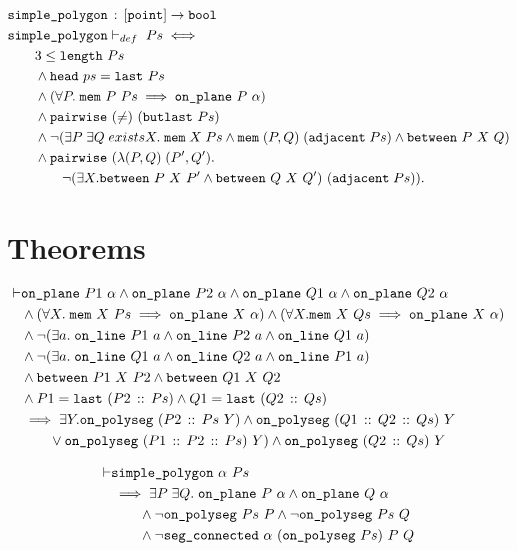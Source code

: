 \begin{align*}
  &\texttt{simple\_polygon}\,:\,[\texttt{point}] \rightarrow \texttt{bool}\\
  &\texttt{simple\_polygon}\vdash_{def}\ Ps \iff \\
  &\qquad 3 \leq \texttt{length}\ Ps\\
  &\qquad\wedge \texttt{head}\ ps = \texttt{last}\ Ps\\
  &\qquad\wedge (\forall P.\;\texttt{mem}\ P\ Ps \implies \texttt{on\_plane}\ P\ \alpha)\\
  &\qquad\wedge \texttt{pairwise}\ (\neq)\ (\texttt{butlast}\ Ps)\\
  &\qquad\wedge \neg(\exists P\;\exists Q\;exists X.\; \texttt{mem}\;X\;Ps\wedge\texttt{mem}\;(P,Q)\;(\texttt{adjacent}\;Ps)\wedge\texttt{between}\ P\ X\ Q)\\
  &\qquad\wedge \texttt{pairwise}\ (\lambda(P,Q)\;(P',Q').\\
  &\qquad\qquad\neg(\exists X. \texttt{between}\ P\ X\ P' \wedge \texttt{between}\ Q\ X\ Q')\ (\texttt{adjacent}\;Ps)).
\end{align*}

\section{Theorems}
\begin{align*}
\vdash &\code{on\_plane}\ P1\ \alpha \wedge \code{on\_plane}\ P2\ \alpha \wedge \code{on\_plane}\ Q1\ \alpha \wedge \code{on\_plane}\ Q2\ \alpha\\
       &\wedge(\forall X.\;\code{mem}\ X\ Ps \implies \code{on\_plane}\ X\ \alpha) \wedge (\forall X. \code{mem}\ X\ Qs \implies \code{on\_plane}\ X\ \alpha)\\
       &\wedge\Triangle{a}{P1}{P2}{Q1}\\
       &\wedge\Triangle{a}{Q1}{Q2}{P1}\\
       &\wedge\code{between}\ P1\ X\ P2 \wedge \code{between}\ Q1\ X\ Q2\\
       &\wedge P1 = \code{last}\ (\cons{P2}{Ps}) \wedge Q1 = \code{last}\ (\cons{Q2}{Qs})\\
       &\implies \exists Y. \code{on\_polyseg}\ (\cons{P2}{Ps}\ Y) \wedge \code{on\_polyseg}\ (\cons{Q1}{\cons{Q2}{Qs}})\ Y\\
       &\qquad\vee \code{on\_polyseg}\ (\cons{P1}{\cons{P2}{Ps}})\ Y) \wedge \code{on\_polyseg}\ (\cons{Q2}{Qs})\ Y
\end{align*}

\begin{align*}
\vdash &\code{simple\_polygon}\ \alpha\ Ps\\
       &\implies \exists P\;\exists Q.\; \code{on\_plane}\ P\ \alpha \wedge \code{on\_plane}\ Q\ \alpha\\
       &\qquad\wedge \neg\code{on\_polyseg}\ Ps\ P \wedge \neg\code{on\_polyseg}\ Ps\ Q\\
       &\qquad\wedge \neg\code{seg\_connected}\ \alpha\ (\code{on\_polyseg}\ Ps)\ P\ Q
\end{align*}

